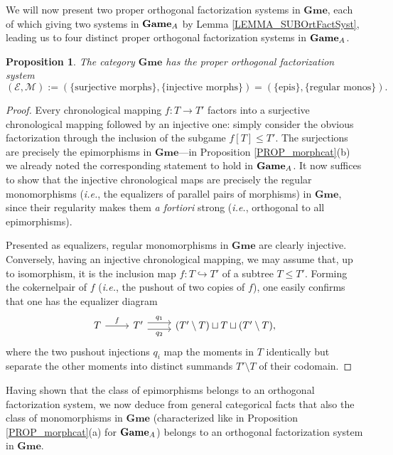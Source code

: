 \documentclass[12pt]{amsart}
\newtheorem{prop}[thm]{Proposition}
\theoremstyle{definition}
\newcommand{\A}{\textup{\textmd{\textsc{A}}}}
\newcommand{\Games}{\mathbf{Game}}
\newcommand{\Gmes}{\mathbf{Gme}}
\begin{document}
We will now present two proper orthogonal factorization systems in $\Gmes$, each of  which giving two systems in $\Games_{\A}$ by Lemma \ref{LEMMA_SUBOrtFactSyst}, leading us to four distinct proper orthogonal factorization systems in $\Games_{\A}$.

\begin{prop}\label{PROP_Gmes_RegMon}
	The category $\Gmes$ has the proper orthogonal factorization system 
	$$(\mathcal E,\mathcal M):=(\{\text{surjective morphs}\},\{\text{injective morphs}\})=(\{\text{epis}\},\{\text{regular monos}\}).$$
\end{prop}
\begin{proof}
	Every chronological mapping $f\colon T\to T'$ factors into a surjective chronological mapping followed by an injective one: simply consider the obvious factorization through the inclusion of the subgame $f[T]\leq T'$. The surjections are precisely the epimorphisms in $\Gmes$---in Proposition \ref{PROP_morphcat}(b) we already noted the corresponding statement to hold in $\Games_{\A}$. It now suffices to show that the injective chronological maps are precisely the regular monomorphisms ({\em i.e.}, the equalizers of parallel pairs of morphisms) in $\Gmes$, since their regularity makes them {\em a fortiori} strong ({\em i.e.}, orthogonal to all epimorphisms).
	
	
	Presented as equalizers, regular monomorphisms in $\Gmes$ are clearly injective. Conversely, having an injective chronological mapping, we may assume that, up to isomorphism, it is the inclusion map $f:T\hookrightarrow T'$ of a subtree $T\leq T'$. Forming the cokernelpair of $f$ ({\em i.e.}, the pushout of two copies of $f$), one easily confirms that one has the equalizer diagram
	\[
	\begin{tikzcd}[column sep=normal,row sep=huge]
		T \arrow[r, "f"] & T' \arrow[r,shift left=.75ex,"q_1"] \arrow[r,shift right=.75ex,"q_2"{below}]  &
		(T'\setminus T)\sqcup T\sqcup(T'\setminus T),
	\end{tikzcd}
	\]
	where the two pushout injections $q_i$ map the moments in $T$ identically but separate the other moments into distinct summands $T'\setminus T$ of their codomain.
\end{proof}

Having shown that the class of epimorphisms belongs to an orthogonal factorization system, we now deduce from general categorical facts that also the class of monomorphisms in $\Gmes$ (characterized like in Proposition \ref{PROP_morphcat}(a) for $\Games_{\A}$) belongs to an orthogonal factorization system in $\Gmes$.
\end{document}
